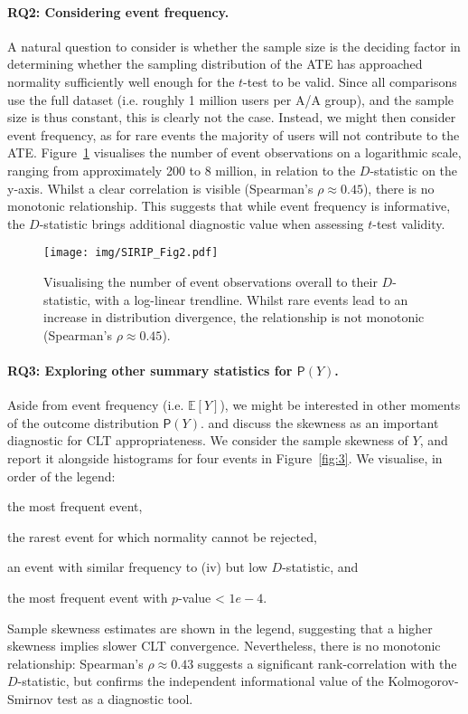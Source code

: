 \paragraph{\textbf{RQ2}: Considering event frequency.}
A natural question to consider is whether the sample size is the deciding factor in determining whether the sampling distribution of the ATE has approached normality sufficiently well enough for the $t$-test to be valid.
Since all comparisons use the full dataset (i.e. roughly 1 million users per A/A group), and the sample size is thus constant, this is clearly not the case.
Instead, we might then consider event frequency, as for rare events the majority of users will not contribute to the ATE.
Figure~\ref{fig:2} visualises the number of event observations on a logarithmic scale, ranging from approximately 200 to 8 million, in relation to the $D$-statistic on the y-axis. 
Whilst a clear correlation is visible (Spearman's $\rho\approx0.45$), there is no monotonic relationship.
This suggests that while event frequency is informative, the $D$-statistic brings additional diagnostic value when assessing $t$-test validity.

\begin{figure}[!t]
    \centering
    \texttt{[image: img/SIRIP\_Fig2.pdf]}
    \caption{Visualising the number of event observations overall to their $D$-statistic, with a log-linear trendline. Whilst rare events lead to an increase in distribution divergence, the relationship is not monotonic (Spearman's $\rho\approx0.45$).}
    \label{fig:2}
\end{figure}

\paragraph{\textbf{RQ3}: Exploring other summary statistics for $\mathsf{P}(Y)$.}
Aside from event frequency (i.e. $\mathbb{E}[Y]$), we might be interested in other moments of the outcome distribution $\mathsf{P}(Y)$.
\citet{Kohavi2014} and \cite{Kohavi2022} discuss the skewness as an important diagnostic for CLT appropriateness.
We consider the sample skewness of $Y$, and report it alongside histograms for four events in Figure~\ref{fig:3}.
We visualise, in order of the legend:
\begin{enumerate*}[label=(\roman*)]
  \item the most frequent event,
  \item the rarest event for which normality cannot be rejected,
  \item an event with similar frequency to (iv) but low $D$-statistic, and
  \item the most frequent event with $p$-value < $1e-4$.
\end{enumerate*}
Sample skewness estimates are shown in the legend, suggesting that a higher skewness implies slower CLT convergence.
Nevertheless, there is no monotonic relationship: Spearman's $\rho\approx0.43$ suggests a significant rank-correlation with the $D$-statistic, but confirms the independent informational value of the Kolmogorov-Smirnov test as a diagnostic tool.


